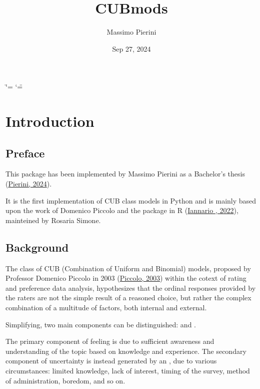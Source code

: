 \documentclass[letterpaper,10pt,english]{sphinxmanual}
\title{CUBmods}
\date{Sep 27, 2024}
\author{Massimo Pierini}
\begin{document}
\ifdefined\shorthandoff
  \ifnum\catcode`\=\string=\active\shorthandoff{=}\fi
  \ifnum\catcode`\"=\active{}\fi
\fi

\pagestyle{empty}
\sphinxmaketitle
\pagestyle{plain}
\sphinxtableofcontents
\pagestyle{normal}
\label{\detokenize{index::doc}}


\sphinxstepscope


\chapter{Introduction}
\label{\detokenize{intro:introduction}}\label{\detokenize{intro::doc}}

\section{Preface}
\label{\detokenize{intro:preface}}
\sphinxAtStartPar
This package has been implemented by Massimo Pierini as a Bachelor’s thesis (\hyperlink{cite.references:id41}{Pierini, 2024}).

\sphinxAtStartPar
It is the first implementation of CUB class models in Python and is mainly based upon
the work of Domenico Piccolo and the  package in R (\hyperlink{cite.references:id22}{Iannario , 2022}),
mainteined by Rosaria Simone.


\section{Background}
\label{\detokenize{intro:background}}
\sphinxAtStartPar
The class of CUB (Combination of Uniform and Binomial) models, proposed by Professor Domenico Piccolo in
2003 (\hyperlink{cite.references:id4}{Piccolo, 2003}) within the cotext of rating and preference data analysis, hypothesizes that
the ordinal responses provided by the raters are not the simple result of a reasoned choice, but rather the
complex combination of a multitude of factors, both internal and external.

\sphinxAtStartPar
Simplifying, two main components can be distinguished:
 and .

\sphinxAtStartPar
The primary component of feeling
is due to sufficient awareness and understanding of the topic based on
knowledge and experience.
The secondary component of uncertainty is instead generated by an , due to
various circumstances: limited knowledge, lack of interest, timing of the survey, method of
administration, boredom, and so on.
\end{document}
